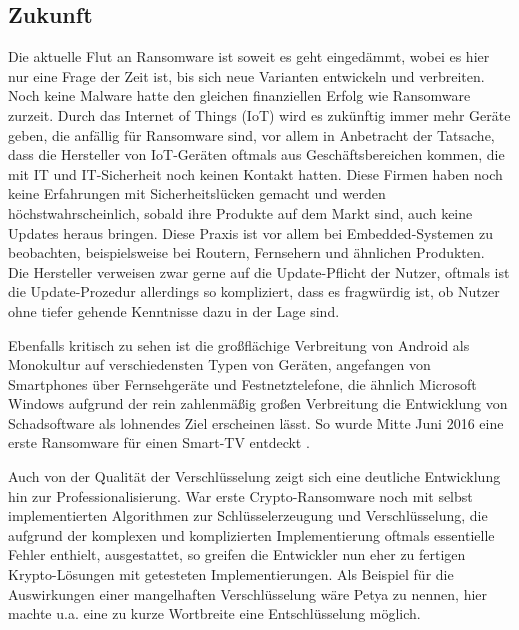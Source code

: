 \subsection{Zukunft}

Die aktuelle Flut an Ransomware ist soweit es geht eingedämmt, wobei es hier nur eine Frage der Zeit ist, bis sich neue Varianten entwickeln und verbreiten. Noch keine Malware hatte den gleichen finanziellen Erfolg wie Ransomware zurzeit. Durch das Internet of Things (IoT) wird es zukünftig immer mehr Geräte geben, die anfällig für Ransomware sind, vor allem in Anbetracht der Tatsache, dass die Hersteller von IoT-Geräten oftmals aus Geschäftsbereichen kommen, die mit IT und IT-Sicherheit noch keinen Kontakt hatten. Diese Firmen haben noch keine Erfahrungen mit Sicherheitslücken gemacht und werden höchstwahrscheinlich, sobald ihre Produkte auf dem Markt sind, auch keine Updates heraus bringen. Diese Praxis ist vor allem bei Embedded-Systemen zu beobachten, beispielsweise bei Routern, Fernsehern und ähnlichen Produkten.\\
Die Hersteller verweisen zwar gerne auf die Update-Pflicht der Nutzer, oftmals ist die Update-Prozedur allerdings so kompliziert, dass es fragwürdig ist, ob Nutzer ohne tiefer gehende Kenntnisse dazu in der Lage sind.

Ebenfalls kritisch zu sehen ist die großflächige Verbreitung von Android als Monokultur auf verschiedensten Typen von Geräten, angefangen von Smartphones über Fernsehgeräte und Festnetztelefone, die ähnlich Microsoft Windows aufgrund der rein zahlenmäßig großen Verbreitung die Entwicklung von Schadsoftware als lohnendes Ziel erscheinen lässt. So wurde Mitte Juni 2016 eine erste Ransomware für einen Smart-TV entdeckt \cite{smarttv}.

Auch von der Qualität der Verschlüsselung zeigt sich eine deutliche Entwicklung hin zur Professionalisierung. War erste Crypto-Ransomware noch mit selbst implementierten Algorithmen zur Schlüsselerzeugung und Verschlüsselung, die aufgrund der komplexen und komplizierten Implementierung oftmals essentielle Fehler enthielt, ausgestattet, so greifen die Entwickler nun eher zu fertigen Krypto-Lösungen mit getesteten Implementierungen. Als Beispiel für die Auswirkungen einer mangelhaften Verschlüsselung wäre Petya zu nennen, hier machte u.a. eine zu kurze Wortbreite eine Entschlüsselung möglich. \cite{petya:decrypt}